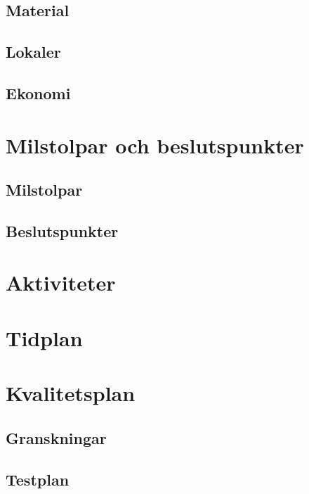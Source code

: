 \documentclass[11pt]{article}
\begin{document}
\begin{flushleft}
\subsection{Material}

\subsection{Lokaler}

\subsection{Ekonomi}

\pagebreak

\section{Milstolpar och beslutspunkter}

\subsection{Milstolpar}

\subsection{Beslutspunkter}

\pagebreak

\section{Aktiviteter}

\pagebreak

\section{Tidplan}

\pagebreak

\section{Kvalitetsplan}

\subsection{Granskningar}

\subsection{Testplan}


\end{flushleft}
\end{document}
